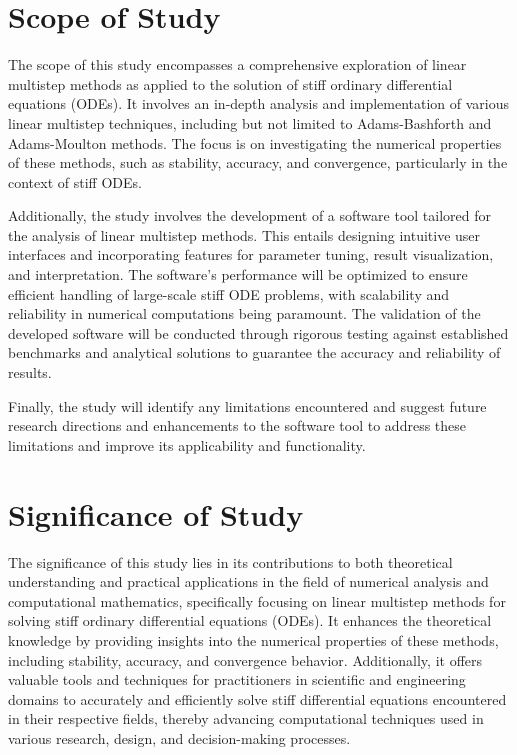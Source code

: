\section{Scope of Study}
The scope of this study encompasses a comprehensive exploration of linear multistep methods as applied to the solution of stiff ordinary differential equations (ODEs). It involves an in-depth analysis and implementation of various linear multistep techniques, including but not limited to Adams-Bashforth and Adams-Moulton methods. The focus is on investigating the numerical properties of these methods, such as stability, accuracy, and convergence, particularly in the context of stiff ODEs.

Additionally, the study involves the development of a software tool tailored for the analysis of linear multistep methods. This entails designing intuitive user interfaces and incorporating features for parameter tuning, result visualization, and interpretation. The software's performance will be optimized to ensure efficient handling of large-scale stiff ODE problems, with scalability and reliability in numerical computations being paramount. The validation of the developed software will be conducted through rigorous testing against established benchmarks and analytical solutions to guarantee the accuracy and reliability of results. 

Finally, the study will identify any limitations encountered and suggest future research directions and enhancements to the software tool to address these limitations and improve its applicability and functionality.

\section{Significance of Study}
The significance of this study lies in its contributions to both theoretical understanding and practical applications in the field of numerical analysis and computational mathematics, specifically focusing on linear multistep methods for solving stiff ordinary differential equations (ODEs). It enhances the theoretical knowledge by providing insights into the numerical properties of these methods, including stability, accuracy, and convergence behavior. Additionally, it offers valuable tools and techniques for practitioners in scientific and engineering domains to accurately and efficiently solve stiff differential equations encountered in their respective fields, thereby advancing computational techniques used in various research, design, and decision-making processes.



